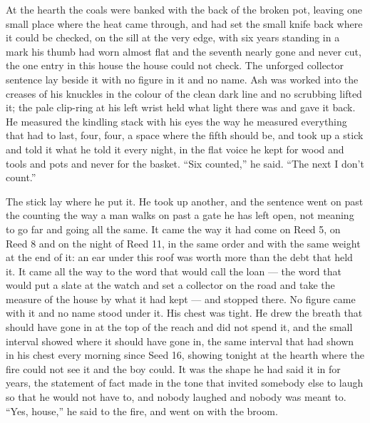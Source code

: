 At the hearth the coals were banked with the back of the broken pot, leaving one small place where the heat came through, and  had set the small knife back where it could be checked, on the sill at the very edge, with six years standing in a mark his thumb had worn almost flat and the seventh nearly gone and never cut, the one entry in this house the house could not check. The unforged collector sentence lay beside it with no figure in it and no name. Ash was worked into the creases of his knuckles in the colour of the clean dark line and no scrubbing lifted it; the pale clip-ring at his left wrist held what light there was and gave it back. He measured the kindling stack with his eyes the way he measured everything that had to last, four, four, a space where the fifth should be, and took up a stick and told it what he told it every night, in the flat voice he kept for wood and tools and pots and never for the basket. “Six counted,” he said. “The next I don't count.”

The stick lay where he put it. He took up another, and the sentence went on past the counting the way a man walks on past a gate he has left open, not meaning to go far and going all the same. It came the way it had come on Reed 5, on Reed 8 and on the night of Reed 11, in the same order and with the same weight at the end of it: an ear under this roof was worth more than the debt that held it. It came all the way to the word that would call the loan --- the word that would put a slate at the watch and set a collector on the road and take the measure of the house by what it had kept --- and stopped there. No figure came with it and no name stood under it. His chest was tight. He drew the breath that should have gone in at the top of the reach and did not spend it, and the small interval showed where it should have gone in, the same interval that had shown in his chest every morning since Seed 16, showing tonight at the hearth where the fire could not see it and the boy could. It was the shape he had said it in for years, the statement of fact made in the tone that invited somebody else to laugh so that he would not have to, and nobody laughed and nobody was meant to. “Yes, house,” he said to the fire, and went on with the broom.

